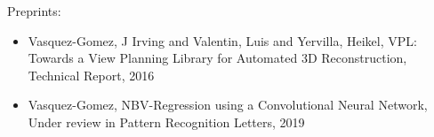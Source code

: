 
 Preprints:\begin{itemize} 
\item Vasquez-Gomez, J Irving and Valentin, Luis and Yervilla, Heikel, VPL: Towards a View Planning Library for Automated 3D Reconstruction, Technical Report, 2016 
\item Vasquez-Gomez, NBV-Regression using a Convolutional Neural Network, Under review in Pattern Recognition Letters, 2019 
\end{itemize} 
